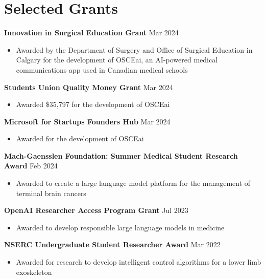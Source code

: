 \documentclass{article}
\begin{document}
\section*{\textcolor{my_colour}{Selected Grants} }
\vspace{-.25em} \hrulefill \vspace{.25em}

\textbf{Innovation in Surgical Education Grant} \hfill Mar 2024
\begin{itemize}
    \item Awarded by the Department of Surgery and Office of Surgical Education in Calgary for the development of OSCEai, an AI-powered medical communications app used in Canadian medical schools
\end{itemize} \vspace{1em}

\textbf{Students Union Quality Money Grant} \hfill Mar 2024
\begin{itemize}
    \item Awarded \$35,797 for the development of OSCEai
\end{itemize} \vspace{1em}

\textbf{Microsoft for Startups Founders Hub} \hfill Mar 2024
\begin{itemize}
    \item Awarded for the development of OSCEai
\end{itemize} \vspace{1em}

\textbf{Mach-Gaensslen Foundation: Summer Medical Student Research Award} \hfill Feb 2024
\begin{itemize}
    \item Awarded to create a large language model platform for the management of terminal brain cancers
\end{itemize} \vspace{1em}

\textbf{OpenAI Researcher Access Program Grant} \hfill Jul 2023
\begin{itemize}
    \item Awarded to develop responsible large language models in medicine
\end{itemize} \vspace{1em}

\textbf{NSERC Undergraduate Student Researcher Award} \hfill Mar 2022
\begin{itemize}
    \item Awarded for research to develop intelligent control algorithms for a lower limb exoskeleton
\end{itemize} %
\end{document}
